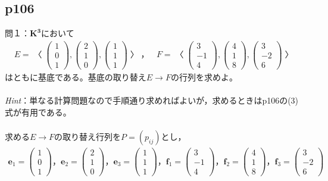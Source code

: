 \documentclass[dvipdfmx,uplatex,11pt]{jsarticle}
\begin{document}
\subsection{p106}
\noindent
問１：$\bm{K^3}$において
\begin{eqnarray*}
E=〈
\begin{pmatrix}
1 \\
0 \\
1
\end{pmatrix}
,
\begin{pmatrix}
2 \\
1 \\
0
\end{pmatrix}
,
\begin{pmatrix}
1 \\
1 \\
1
\end{pmatrix}
〉，~~~~F=〈
\begin{pmatrix}
3 \\
-1 \\
4
\end{pmatrix}
,
\begin{pmatrix}
4 \\
1 \\
8
\end{pmatrix}
,
\begin{pmatrix}
3 \\
-2 \\
6
\end{pmatrix}
〉
\end{eqnarray*}
はともに基底である。基底の取り替え$E→F$の行列を求めよ。\\ \\
\textsl{Hint}：単なる計算問題なので手順通り求めればよいが，求めるときはp106の(3)式が有用である。\\ \\
求める$E→F$の取り替え行列を$P=(p_{ij})$とし，
\begin{eqnarray*}
\bm{e}_1=
\begin{pmatrix}
1 \\
0 \\
1
\end{pmatrix}
，
\bm{e}_2=
\begin{pmatrix}
2 \\
1 \\
0
\end{pmatrix}
，
\bm{e}_3=
\begin{pmatrix}
1 \\
1 \\
1
\end{pmatrix}
，
\bm{f}_1=
\begin{pmatrix}
3 \\
-1 \\
4
\end{pmatrix}
，
\bm{f}_2=
\begin{pmatrix}
4 \\
1 \\
8
\end{pmatrix}
，
\bm{f}_3=
\begin{pmatrix}
3 \\
-2 \\
6
\end{pmatrix}
\end{eqnarray*}
\end{document}
